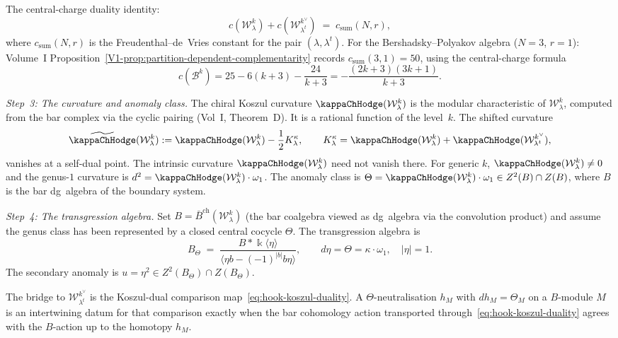 \begin{construction}
The central-charge duality identity:
\begin{equation}\label{eq:hook-cc-sum}
c(\mathcal W_\lambda^k)
+c(\mathcal W_{\lambda^t}^{k^\vee})
\;=\;
c_{\mathrm{sum}}(N,r),
\end{equation}
where $c_{\mathrm{sum}}(N,r)$ is the Freudenthal--de~Vries
constant for the pair $(\lambda,\lambda^t)$. For the
Bershadsky--Polyakov algebra ($N=3$, $r=1$):
Volume~I Proposition~\ref*{V1-prop:partition-dependent-complementarity}
records $c_{\mathrm{sum}}(3,1) = 50$, using the central-charge
formula
\[
c(\mathcal{B}^k)
= 25 - 6(k+3) - \frac{24}{k+3}
= -\frac{(2k+3)(3k+1)}{k+3}.
\]

\emph{Step~3: The curvature and anomaly class.}
The chiral Koszul curvature $\kappaChHodge(\mathcal W_\lambda^k)$ is
the modular characteristic of $\mathcal W_\lambda^k$,
computed from the bar complex via the cyclic pairing
(Vol~I, Theorem~D). It is a rational function of the
level~$k$.  The shifted curvature
\[
\widetilde\kappaChHodge(\mathcal W_\lambda^k)
:=\kappaChHodge(\mathcal W_\lambda^k)-\frac{1}{2}K^\kappa_\lambda,
\qquad
K^\kappa_\lambda=
\kappaChHodge(\mathcal W_\lambda^k)+
\kappaChHodge(\mathcal W_{\lambda^t}^{k^\vee}),
\]
vanishes at a self-dual point.  The intrinsic curvature
\(\kappaChHodge(\mathcal W_\lambda^k)\) need not vanish there.  For generic
$k$,
$\kappaChHodge(\mathcal W_\lambda^k)\neq 0$ and the genus-$1$ curvature is
$d^2=\kappaChHodge(\mathcal W_\lambda^k)\cdot\omega_1$. The anomaly class is
$\Theta=\kappaChHodge(\mathcal W_\lambda^k)\cdot\omega_1\in Z^2(B)\cap Z(B)$, where $B$
is the bar dg~algebra of the boundary system.

\emph{Step~4: The transgression algebra.}
Set $B=\bar B^{\mathrm{ch}}(\mathcal W_\lambda^k)$
(the bar coalgebra viewed as dg~algebra via the convolution
product) and assume the genus class has been represented by a closed
central cocycle \(\Theta\). The transgression algebra is
\[
B_\Theta
\;=\;
\frac{B*\Bbbk\langle\eta\rangle}
{\langle\eta b-(-1)^{|b|}b\eta\rangle},
\qquad
d\eta=\Theta=\kappa\cdot\omega_1,
\quad|\eta|=1.
\]
The secondary anomaly is
$u=\eta^2\in Z^2(B_\Theta)\cap Z(B_\Theta)$.

The bridge to \(\mathcal W_{\lambda^t}^{k^\vee}\) is the Koszul-dual
comparison map~\eqref{eq:hook-koszul-duality}. A
\(\Theta\)-neutralisation \(h_M\) with \(dh_M=\Theta_M\) on a
\(B\)-module \(M\) is an intertwining datum for that comparison
exactly when the bar cohomology action transported
through~\eqref{eq:hook-koszul-duality} agrees with the \(B\)-action
up to the homotopy \(h_M\).


\end{construction}
